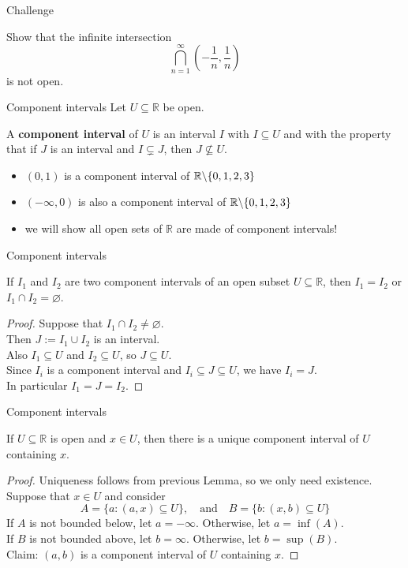 \documentclass{beamer}
\begin{document}
\begin{frame}{Challenge}
\begin{prob}
Show that the infinite intersection
$$\bigcap_{n=1}^\infty (-\frac{1}{n},\frac{1}{n})$$
is not open.
\end{prob}
\end{frame}

\begin{frame}{Component intervals}
Let $U\subseteq \mathbb{R}$ be open.
\pause
\begin{defn}
A \textbf{component interval} of $U$ is an interval $I$ with $I\subseteq U$ and with the property that if $J$ is an interval and $I\subsetneq J$, then $J\nsubseteq U$.
\end{defn}
\begin{itemize}
\pause
\item $(0,1)$ is a component interval of $\mathbb{R}\backslash \{0,1,2,3\}$
\pause
\item $(-\infty,0)$ is also a component interval of $\mathbb{R}\backslash \{0,1,2,3\}$
\pause
\item we will show all open sets of $\mathbb{R}$ are made of component intervals!
\end{itemize}
\end{frame}

\begin{frame}{Component intervals}
\begin{lemma}
If $I_1$ and $I_2$ are two component intervals of an open subset $U\subseteq\mathbb{R}$, then $I_1=I_2$ or $I_1\cap I_2 = \varnothing$.
\end{lemma}
\pause
\begin{proof}
\pause
Suppose that $I_1\cap I_2 \neq \varnothing$.\\
\pause
Then $J := I_1\cup I_2$ is an interval.\\
\pause
Also $I_1\subseteq U$ and $I_2\subseteq U$, so $J\subseteq U$.\\
\pause
Since $I_i$ is a component interval and $I_i\subseteq J\subseteq U$, we have $I_i = J$.\\
\pause
In particular $I_1 = J = I_2$.
\end{proof}
\end{frame}

\begin{frame}{Component intervals}
\begin{thm}[Apostol 3.10]
If $U\subseteq\mathbb{R}$ is open and $x\in U$, then there is a unique component interval of $U$ containing $x$.
\end{thm}
\pause
\begin{proof}
Uniqueness follows from previous Lemma, so we only need existence.\\
\pause
Suppose that $x\in U$ and consider
$$A = \{a: (a,x)\subseteq U\},\quad\text{and}\quad B = \{b: (x,b)\subseteq U\}$$
\pause
If $A$ is not bounded below, let $a=-\infty$.  Otherwise, let $a = \inf (A)$.\\
\pause
If $B$ is not bounded above, let $b=\infty$.  Otherwise, let $b = \sup (B)$.\\
\pause
Claim: $(a,b)$ is a component interval of $U$ containing $x$.
\end{proof}
\end{frame}
\end{document}
